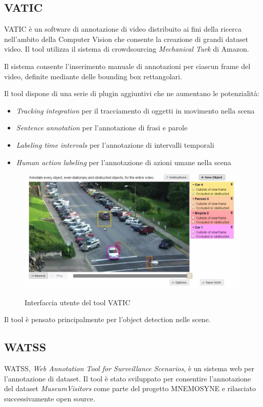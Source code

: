 \subsection{VATIC}

VATIC è un software di annotazione di video distribuito ai fini della ricerca nell'ambito della Computer Vision che consente la creazione di grandi dataset video. Il tool utilizza il sistema di crowdsourcing \emph{Mechanical Turk} di Amazon.

Il sistema consente l'inserimento manuale di annotazioni per ciascun frame del video, definite mediante delle bounding box rettangolari. 

Il tool dispone di una serie di plugin aggiuntivi che ne aumentano le potenzialità:
\begin{itemize}
\item \emph{Tracking integration} per il tracciamento di oggetti in movimento nella scena
\item \emph{Sentence annotation} per l'annotazione di frasi e parole
\item \emph{Labeling time intervals} per l'annotazione di intervalli temporali
\item \emph{Human action labeling} per l'annotazione di azioni umane nella scena
\end{itemize}

\begin{figure}[h]
\centering
\includegraphics[width=0.6\linewidth]{images/vatic.jpg}
  \label{fig:vipergt}
  \caption{Interfaccia utente del tool VATIC}
\end{figure}

Il tool è pensato principalmente per l'object detection nelle scene.

\subsection{WATSS}

WATSS\cite{Bartoli:2015:WWA:2733373.2807411}, \emph{Web Annotation Tool for Surveillance Scenarios}, è un sistema web per l'annotazione di dataset. Il tool è stato sviluppato per consentire l'annotazione del dataset \emph{MuseumVisitors}\cite{bartoli2015museumvisitors} come parte del progetto MNEMOSYNE e rilasciato successivamente open source.


